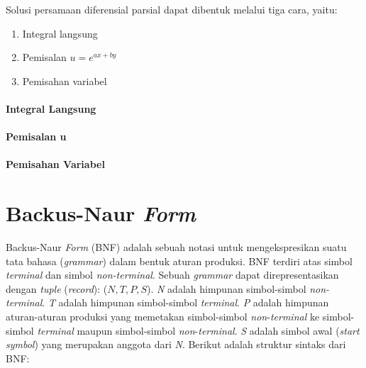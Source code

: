 Solusi persamaan diferensial parsial dapat dibentuk melalui tiga cara, yaitu:

\begin{enumerate}[1.]

	\item Integral langsung
	\item Pemisalan \begin{math} u = e^{ax + by} \end{math}
	\item Pemisahan variabel

\end{enumerate}

\paragraph{Integral Langsung}
\label{parff:PDPIL}

\paragraph{Pemisalan u} %
\label{parff:PDPIL}

\paragraph{Pemisahan Variabel}
\label{parff:PDPPV}


\section{Backus-Naur \textit{Form}}
\label{sec:BNF}

Backus-Naur \textit{Form} (BNF) adalah sebuah notasi untuk mengekspresikan suatu tata bahasa (\textit{grammar}) dalam bentuk aturan produksi. BNF terdiri atas simbol \textit{terminal} dan simbol \textit{ non-terminal}. Sebuah \textit{grammar} dapat direpresentasikan dengan \textit{tuple} (\textit{record}): (\begin{math} {N, T, P, S} \end{math}). \textit{N} adalah himpunan simbol-simbol \textit{non-terminal}. \textit{T} adalah himpunan simbol-simbol \textit{terminal}. \textit{P} adalah himpunan aturan-aturan produksi yang memetakan simbol-simbol \textit{non}-\textit{terminal} ke simbol-simbol \textit{terminal} maupun simbol-simbol \textit{non}-\textit{terminal}. \textit{S} adalah simbol awal (\textit{start symbol}) yang merupakan anggota dari \textit{N}. Berikut adalah struktur sintaks dari BNF:

